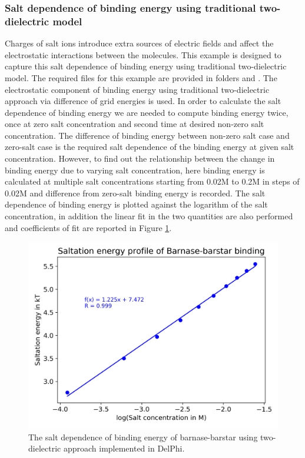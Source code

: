 \documentclass[9pt,tutorial]{livecoms}
\newcommand*\ttvar[1]{\texttt{\expandafter\dottvar\detokenize{#1}\relax}}
\newcommand*\dottvar[1]{\ifx\relax#1\else
  \expandafter\ifx\string_#1\string_\allowbreak\else#1\fi
  \expandafter\dottvar\fi}
\begin{document}
\subsubsection{Salt dependence of binding energy using traditional two-dielectric model} \label{sec:slat-dependence-of-binding-energy-using-two-dielectric-model}
Charges of salt ions introduce extra sources of electric fields and affect the electrostatic interactions between the molecules. This example is designed to capture this salt dependence of binding energy using traditional two-dielectric model. The required files for this example are provided in folders \ttvar{Example_3.1.7/} and \ttvar{Example_3.1.7/saltation/}. The electrostatic component of binding energy using traditional two-dielectric approach via difference of grid energies  is used. In order to calculate the salt dependence of binding energy we are needed to compute binding energy twice, once at zero salt concentration and second time at desired non-zero salt concentration. The difference of binding energy between non-zero salt case and zero-salt case is the required salt dependence of the binding energy at given salt concentration. However, to find out the relationship between the change in binding energy due to varying salt concentration, here binding energy is calculated at multiple salt concentrations starting from 0.02M to 0.2M in steps of 0.02M and difference from zero-salt binding energy is recorded. The salt dependence of binding energy is plotted against the logarithm of the salt concentration, in addition the linear fit in the two quantities are also performed and coefficients of fit are reported in Figure \ref{fig:plot_saltation_pp_binding}.

\begin{figure}[hbt!]
\includegraphics[width=\linewidth]{Figure_13.png}
\caption{The salt dependence of binding energy of barnase-barstar using two-dielectric approach implemented in DelPhi.}
\label{fig:plot_saltation_pp_binding}
\end{figure}
\end{document}
